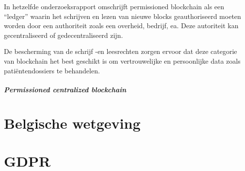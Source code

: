 In hetzelfde onderzoeksrapport omschrijft \textcite{Yaga2018} permissioned blockchain als een ``ledger'' waarin het schrijven en lezen van nieuwe blocks geauthoriseerd moeten worden door een authoriteit zoals een overheid, bedrijf, ea. Deze autoriteit kan gecentraliseerd of gedecentraliseerd zijn.

De bescherming van de schrijf -en leesrechten zorgen ervoor dat deze categorie van blockchain het best geschikt is om vertrouwelijke en persoonlijke data zoals patiëntendossiers te behandelen.

\subparagraph{Permissioned centralized blockchain}



\section{Belgische wetgeving}


\section{GDPR}
